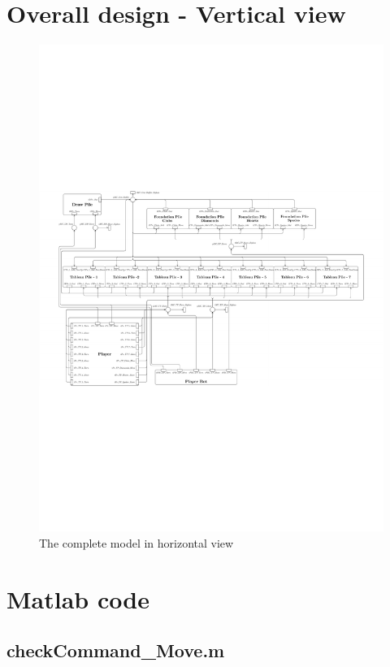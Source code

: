 \documentclass[runningheads,a4paper]{llncs}
\newcommand{\GPenSIM}{../GPenSIM}
\begin{document}
\section{Overall design - Vertical view}
\label{app:full_vertical}
\begin{figure}
	\includegraphics[trim=40 100 100 310,angle=90,scale=1.4]{images/overallViewPdf}
	\caption{The complete model in horizontal view}
	\label{fig:full_vertical}
\end{figure}
\clearpage
\section{Matlab code}	
\subsection{checkCommand\_Move.m}
\label{app:checkCommand_Move}

\end{document}
